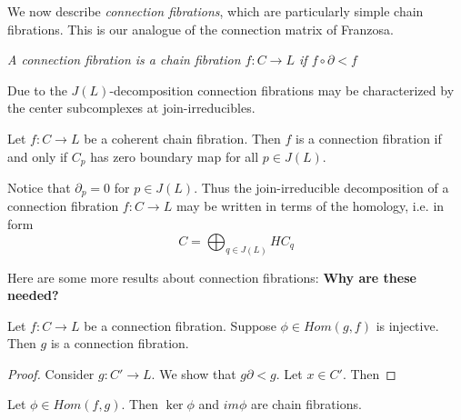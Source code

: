 We now describe {\em connection fibrations}, which are particularly simple chain fibrations. This is our analogue of the connection matrix of Franzosa.

\begin{defn}\label{def:connection}
{\em
A {\em connection fibration} is a chain fibration $f:C\to L$ if $f\circ\partial < f$
}
\end{defn}



Due to the $J(L)$-decomposition connection fibrations may be characterized by the center subcomplexes at join-irreducibles. 


\begin{prop}
Let $f:C\to L$ be a coherent chain fibration.  Then $f$ is a connection fibration if and only if $C_p$ has zero boundary map for all $p\in J(L)$.
\end{prop}



\begin{rem}
Notice that $\partial_p = 0$ for  $p\in J(L)$.  Thus the join-irreducible decomposition of a connection fibration $f:C\to L$ may be written in terms of the homology, i.e. in form $$C=\bigoplus_{q\in J(L)} HC_q$$
\end{rem}

Here are some more results about connection fibrations: {\bf Why are these needed?}

\begin{prop}
Let $f:C\to L$ be a connection fibration.  Suppose $\phi\in Hom(g,f)$ is injective.  Then $g$ is a connection fibration.
\end{prop}
\begin{proof}
Consider $g:C'\to L$.  We show that $g\partial < g$.  Let $x\in C'$.  Then 


\end{proof}



\begin{prop}
Let $\phi\in Hom(f,g)$.  Then $\ker \phi$ and $im\phi$ are chain fibrations.
\end{prop}






